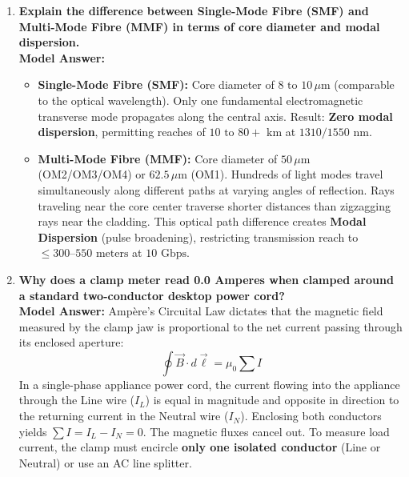 \begin{enumerate}[leftmargin=*,label=\textbf{Q\arabic*.}]
    \item \textbf{Explain the difference between Single-Mode Fibre (SMF) and Multi-Mode Fibre (MMF) in terms of core diameter and modal dispersion.} \\
    \textbf{Model Answer:}
    \begin{itemize}
        \item \textbf{Single-Mode Fibre (SMF):} Core diameter of $8\text{ to }10\,\mu\text{m}$ (comparable to the optical wavelength). Only one fundamental electromagnetic transverse mode propagates along the central axis. Result: \textbf{Zero modal dispersion}, permitting reaches of $10\text{ to }80+\text{ km}$ at $1310/1550\text{ nm}$.
        \item \textbf{Multi-Mode Fibre (MMF):} Core diameter of $50\,\mu\text{m}$ (OM2/OM3/OM4) or $62.5\,\mu\text{m}$ (OM1). Hundreds of light modes travel simultaneously along different paths at varying angles of reflection. Rays traveling near the core center traverse shorter distances than zigzagging rays near the cladding. This optical path difference creates \textbf{Modal Dispersion} (pulse broadening), restricting transmission reach to $\le 300\text{--}550\text{ meters}$ at $10\text{ Gbps}$.
    \end{itemize}

    \item \textbf{Why does a clamp meter read 0.0 Amperes when clamped around a standard two-conductor desktop power cord?} \\
    \textbf{Model Answer:} Ampère's Circuital Law dictates that the magnetic field measured by the clamp jaw is proportional to the net current passing through its enclosed aperture:
    \[
    \oint \vec{B} \cdot d\vec{\ell} = \mu_0 \sum I
    \]
    In a single-phase appliance power cord, the current flowing into the appliance through the Line wire ($I_L$) is equal in magnitude and opposite in direction to the returning current in the Neutral wire ($I_N$). Enclosing both conductors yields $\sum I = I_L - I_N = 0$. The magnetic fluxes cancel out. To measure load current, the clamp must encircle \textbf{only one isolated conductor} (Line or Neutral) or use an AC line splitter.


\end{enumerate}
